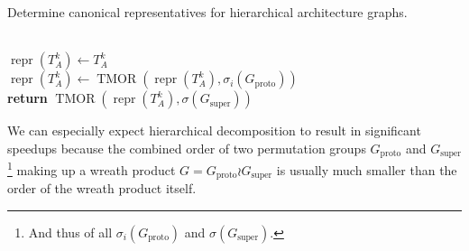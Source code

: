 \begin{algorithm}
  \caption{Determine canonical representatives for hierarchical architecture graphs.}
  \label{alg:task_repr_wreath_prod}
  \begin{algorithmic}[1]

    \\
    \State $\operatorname{repr}(T_A^k) \gets T_A^k$
    \\
      \State $\operatorname{repr}(T_A^k) \gets
                \operatorname{TMOR}(
                  \operatorname{repr}(T_A^k),
                  \sigma_i(G_{\operatorname{proto}}))$
    \EndFor
    \\
    \State \textbf{return} $\operatorname{TMOR}(
                              \operatorname{repr}(T_A^k),
                              \sigma(G_{\operatorname{super}}))$
  \EndProcedure
  \end{algorithmic}
\end{algorithm}

We can especially expect hierarchical decomposition to result in significant
speedups because the combined order of two permutation groups
$G_{\mathrm{proto}}$ and $G_{\mathrm{super}}$\footnote{And thus of all
$\sigma_i(G_{\mathrm{proto}})$ and $\sigma(G_{\mathrm{super}})$.} making up a
wreath product $G = G_{\mathrm{proto}} \wr G_{\mathrm{super}}$ is usually much
smaller than the order of the wreath product itself.
